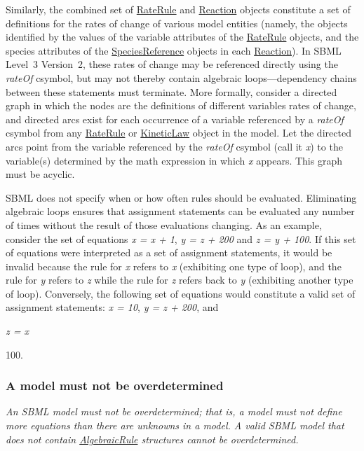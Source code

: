 Similarly, the combined set of \hyperlink{class_rate_rule}{Rate\+Rule} and \hyperlink{class_reaction}{Reaction} objects constitute a set of definitions for the rates of change of various model entities (namely, the objects identified by the values of the \textquotesingle{}variable\textquotesingle{} attributes of the \hyperlink{class_rate_rule}{Rate\+Rule} objects, and the \textquotesingle{}species\textquotesingle{} attributes of the \hyperlink{class_species_reference}{Species\+Reference} objects in each \hyperlink{class_reaction}{Reaction}). In S\+B\+ML Level~3 Version~2, these rates of change may be referenced directly using the {\itshape rate\+Of} csymbol, but may not thereby contain algebraic loops---dependency chains between these statements must terminate. More formally, consider a directed graph in which the nodes are the definitions of different variables\textquotesingle{} rates of change, and directed arcs exist for each occurrence of a variable referenced by a {\itshape rate\+Of} csymbol from any \hyperlink{class_rate_rule}{Rate\+Rule} or \hyperlink{class_kinetic_law}{Kinetic\+Law} object in the model. Let the directed arcs point from the variable referenced by the {\itshape rate\+Of} csymbol (call it {\itshape x}) to the variable(s) determined by the \textquotesingle{}math\textquotesingle{} expression in which {\itshape x} appears. This graph must be acyclic.

S\+B\+ML does not specify when or how often rules should be evaluated. Eliminating algebraic loops ensures that assignment statements can be evaluated any number of times without the result of those evaluations changing. As an example, consider the set of equations {\itshape x = x + 1}, {\itshape y = z + 200} and {\itshape z = y + 100}. If this set of equations were interpreted as a set of assignment statements, it would be invalid because the rule for {\itshape x} refers to {\itshape x} (exhibiting one type of loop), and the rule for {\itshape y} refers to {\itshape z} while the rule for {\itshape z} refers back to {\itshape y} (exhibiting another type of loop). Conversely, the following set of equations would constitute a valid set of assignment statements\+: {\itshape x = 10}, {\itshape y = z + 200}, and {\itshape z = x
\begin{DoxyItemize}
\item 100.
\end{DoxyItemize}}

{\itshape }\hypertarget{classdoc__rules__general__summary_rules-not-overdetermined}{}\subsubsection{A model must not be overdetermined}\label{classdoc__rules__general__summary_rules-not-overdetermined}
{\itshape  An S\+B\+ML model must not be overdetermined; that is, a model must not define more equations than there are unknowns in a model. A valid S\+B\+ML model that does not contain \hyperlink{class_algebraic_rule}{Algebraic\+Rule} structures cannot be overdetermined.}

